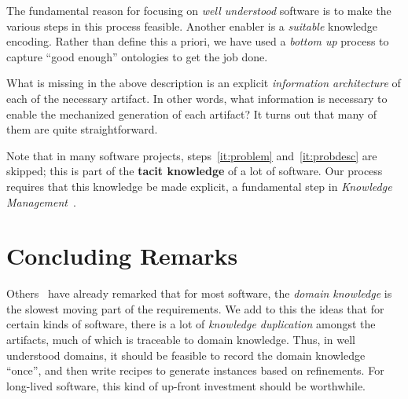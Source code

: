 \documentclass[a4paper,UKenglish,cleveref,autoref,thm-restate]{oasics-v2021}
\begin{document}
The fundamental reason for focusing on \emph{well understood} software is to
make the various steps in this process feasible. Another enabler is a
\emph{suitable} knowledge encoding. Rather than define this a priori, we have
used a \emph{bottom up} process to capture ``good enough'' ontologies to get the
job done.

What is missing in the above description is an explicit \emph{information
architecture} of each of the necessary artifact. In other words, what
information is necessary to enable the mechanized generation of each artifact?
It turns out that many of them are quite straightforward.

Note that in many software projects, steps~\ref{it:problem}
and~\ref{it:probdesc} are skipped; this is part of the \textbf{tacit knowledge}
of a lot of software.  Our process requires that this knowledge be made
explicit, a fundamental step in \emph{Knowledge Management}~\cite{Dalkir2011}.


\section{Concluding Remarks}
\label{sec:concluding-remarks}




Others~\cite{bjorner2021domaineng} have already remarked that for most software,
the \emph{domain knowledge} is the slowest moving part of the requirements.
We add to this the ideas that for certain kinds of software, there is a lot of
\emph{knowledge duplication} amongst the artifacts, much of which is traceable
to domain knowledge. Thus, in well understood domains, it should be feasible to
record the domain knowledge ``once'', and then write recipes to generate
instances based on refinements. For long-lived software, this kind of up-front
investment should be worthwhile.
\end{document}
